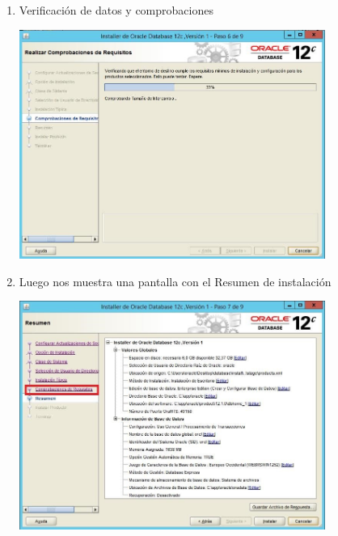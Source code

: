 \begin{enumerate}[1.]
	\hfill \break
	\hfill \break
	\hfill \break
	\hfill \break
	\hfill \break
	\hfill \break
	\hfill \break
	\hfill \break
	\item Verificaci\'on de datos y comprobaciones\\
	\begin{center}
	\includegraphics[width=10cm]{./Imagenes/img18} 
	\end{center}

	\item Luego nos muestra una pantalla con el Resumen de instalaci\'on\\
	\begin{center}
	\includegraphics[width=10cm]{./Imagenes/img19} 
	\end{center}


\end{enumerate}
